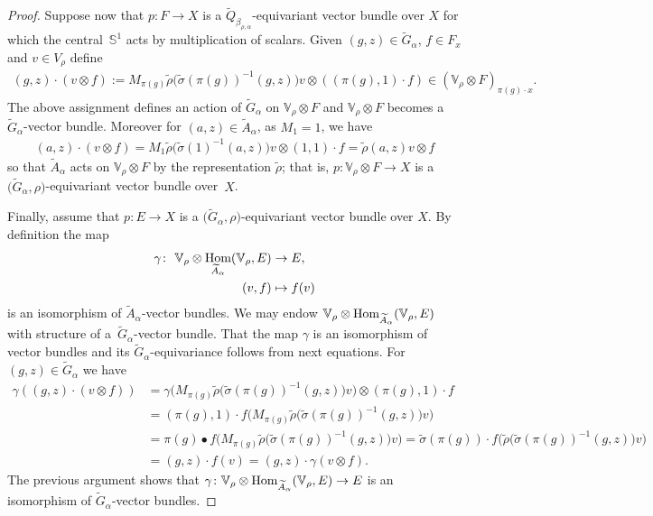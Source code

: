 \documentclass[pdftex]{sigma}
\def\S{\mathbb{S}}
\def\V{\mathbb{V}}
\DeclareMathOperator{\Hom}{\textup{Hom}}
\theoremstyle{definition}
\numberwithin{equation}{section}
\begin{document}
\begin{proof}
Suppose now that $p \colon F \rightarrow X$ is a
$\widetilde{Q}_{\beta_{\rho,\alpha}}$-equivariant vector bundle over $X$
for which the central~$\S^{1}$ acts by multiplication of
scalars. Given $(g,z)\in \widetilde{G}_{\alpha}$, $f\in F_{x}$ and $v\in
V_{\rho}$ define
\begin{gather}
(g,z)\cdot (v\otimes f):=M_{\pi(g)}\tilde{\rho}\big(\tilde{\sigma}(\pi(g))^{-1}(g,z)\big)v\otimes
((\pi(g),1)\cdot f)\in (\V_{\rho}\otimes F)_{\pi(g)\cdot x}.
\label{ecu:ac2}
\end{gather}
The above assignment defines an action of $\widetilde{G}_{\alpha}$
on $\V_{\rho}\otimes F$ and $\V_{\rho}\otimes F$
becomes a $\widetilde{G}_{\alpha}$-vector bundle.
Moreover for $(a,z)\in \widetilde{A}_{\alpha}$, as $M_{1}=1$, we have
\begin{gather*}
(a,z)\cdot (v\otimes
f)=M_{1}\tilde{\rho}\big(\tilde{\sigma}(1)^{-1}(a,z)\big)v\otimes
(1,1)\cdot f=\tilde{\rho}(a,z)v\otimes f
\end{gather*}
so that $\widetilde{A}_{\alpha}$ acts on $\V_{\rho}\otimes
F$ by the representation $\tilde{\rho}$; that is,
$p\colon \V_{\rho}\otimes F\rightarrow X$ is a
$\big(\widetilde{G}_{\alpha},\rho\big)$-equivariant vector bundle
over~$X$.
	
Finally, assume that $p\colon E \rightarrow X$ is a
$\big(\widetilde{G}_{\alpha},\rho\big)$-equivariant vector bundle over $X$.
By definition the map
\begin{align*}
\gamma\colon \ \V_{\rho}\otimes
\Hom_{\widetilde{A}_{\alpha}}(\V_{\rho},E)&\rightarrow E,
\\
(v,f)&\mapsto f(v)
\end{align*}
is an isomorphism of $\widetilde{A}_{\alpha}$-vector bundles. We may endow
$\V_{\rho}\otimes\Hom_{\widetilde{A}_{\alpha}}(\V_{\rho},E)$
with structure of a~$\widetilde{G}_{\alpha}$-vector bundle. That the map
$\gamma$ is an isomorphism of vector bundles and its
$\widetilde{G}_{\alpha}$-equivariance follows from next equations.
For $(g,z)\in \widetilde{G}_{\alpha}$ we have
\begin{align*}
\gamma((g,z)\cdot(v\otimes
f))&=\gamma\big(M_{\pi(g)}\tilde{\rho}\big(\tilde{\sigma}(\pi(g))^{-1}(g,z)\big)v\big)\otimes
(\pi(g),1)\cdot f\\
&=(\pi(g),1)\cdot f
\big(M_{\pi(g)}\tilde{\rho}\big(\tilde{\sigma}(\pi(g))^{-1}(g,z)\big)v\big)\\
&=\pi(g)\bullet\!
f\big(M_{\pi(g)}\tilde{\rho}\big(\tilde{\sigma}(\pi(g))^{-1}(g,z)\big)v\big)
\!=\tilde{\sigma}(\pi(g))\!\cdot
f\big(\tilde{\rho}\big(\tilde{\sigma}(\pi(g))^{-1}(g,z)\big)v\big)\\
	&=(g,z)\cdot f(v)=(g,z)\cdot\gamma(v\otimes f).
\end{align*}
The previous argument shows that $\gamma\colon
\V_{\rho}\otimes
\Hom_{\widetilde{A}_{\alpha}}(\V_{\rho},E)\rightarrow
E$ is an isomorphism of $\widetilde{G}_{\alpha}$-vector bundles.
	

\end{proof}
\end{document}
